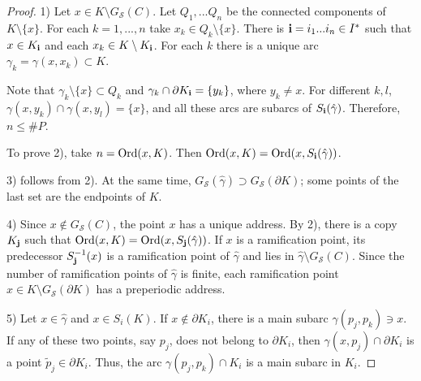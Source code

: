 \documentclass[11pt,reqno]{amsart}
\newcommand{\hga}{{\hat\gamma}}
\newcommand{\eS}{{\mathcal S}}
\begin{document}
\begin{proof} 1) Let  $x \in K\setminus G_{\eS}(C)$.  Let $Q_1,... Q_n$ be the connected components of $K \setminus \{x\}$. 
For each $k=1,...,n$ take  $x_k \in Q_k\setminus\{x\}$. There is ${\bf {i}}=i_1...i_n\in I^*$ such that
$x \in K_{\bf {i}}$ and
each $x_k\in K\setminus K_{\bf {i}}$. For each $k$ there is a unique arc $\gamma_k=\gamma(x,x_k){\subset} K$.


Note that $\gamma_k\setminus\{x\}{\subset} Q_k$ and
$\gamma_k\cap {\partial} K_{\bf {i}}=\{y_k\}$, where $y_k\neq x$. For different $k,l$,  
$\gamma(x,y_k)\cap \gamma(x,y_l)=\{x\}$, and all these arcs are  subarcs of
$S_{\bf {i}}(\hga)$. Therefore, $n\le\#P$.


To prove 2), take
$n={\mathop{\rm Ord} \nolimits}(x,K)$. Then ${\mathop{\rm Ord} \nolimits}(x,K)={\mathop{\rm Ord} \nolimits}(x,S_{\bf {i}}(\hga))$.

3) follows from 2). At the same time, $G_{\eS}(\hat \gamma){\supset} G_{\eS}({\partial} K)$; some points of the last set are the endpoints of $K$.

4) Since  $x\notin  G_{{\eS}}(C)$, the point $x$ has a unique address. 
By 2), there is a copy $K_{\bf {j}}$ such that  ${\mathop{\rm Ord} \nolimits}(x,K)={\mathop{\rm Ord} \nolimits}(x,S_{\bf {j}}(\hga))$. %
If $x$ is a ramification point,  its predecessor $ S_{\bf {j}}^{-1}(x)$ 
is a ramification point of $\hga$ and lies in $\hga\setminus G_{{\eS}}(C)$.
Since the  number of  ramification points of $\hga$ is finite,  each ramification point $x\in K\setminus G_{{\eS}}({\partial} K)$ has a preperiodic address. 

5) Let $x\in\hga$ and $x\in S_i(K)$. If $x\notin {\partial} K_i$, there is a main subarc $\gamma(p_j,p_k)\ni x$. If any of these two points, say $p_j$, does not belong to ${\partial} K_i$, then $\gamma(x,p_j)\cap {\partial} K_i$ is a point  $\tilde p_j\in {\partial} K_i$. Thus, the arc $\gamma(p_j,p_k)\cap K_i$ is a  main subarc in  $K_i$. 
\end{proof}
\end{document}

